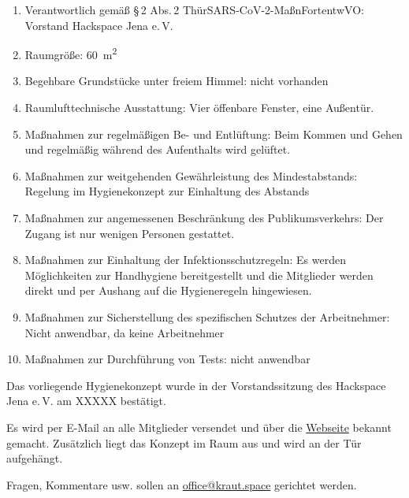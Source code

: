\documentclass[a4paper,12pt,parskip=half]{scrartcl}
\begin{document}
\begin{enumerate}
 \item Verantwortlich gemäß §\,2 Abs.\,2 ThürSARS-CoV-2-MaßnFortentwVO: Vorstand Hackspace Jena e.\,V.
 \item Raumgröße: \SI{60}{\square\metre}
 \item Begehbare Grundstücke unter freiem Himmel: nicht vorhanden
 \item Raumlufttechnische Ausstattung: Vier öffenbare Fenster, eine Außentür.
 \item Maßnahmen zur regelmäßigen Be- und Entlüftung: Beim Kommen und Gehen und regelmäßig während des Aufenthalts wird gelüftet.
 \item Maßnahmen zur weitgehenden Gewährleistung des Mindestabstands: Regelung
   im Hygienekonzept zur Einhaltung des Abstands
 \item Maßnahmen zur angemessenen Beschränkung des Publikumsverkehrs: Der Zugang
   ist nur wenigen Personen gestattet.
 \item Maßnahmen zur Einhaltung der Infektionsschutzregeln: Es werden Möglichkeiten zur Handhygiene bereitgestellt und die Mitglieder werden direkt und per Aushang auf die Hygieneregeln hingewiesen.
 \item Maßnahmen zur Sicherstellung des spezifischen Schutzes der Arbeitnehmer:
   Nicht anwendbar, da keine Arbeitnehmer
 \item Maßnahmen zur Durchführung von Tests: nicht anwendbar
\end{enumerate}

Das vorliegende Hygienekonzept wurde in der Vorstandssitzung des Hackspace Jena e.\,V. am XXXXX bestätigt.

Es wird per E-Mail an alle Mitglieder versendet und über die
\href{https://kraut.space}{Webseite} bekannt gemacht. Zusätzlich liegt das Konzept im Raum aus und wird an der Tür aufgehängt.

Fragen, Kommentare usw. sollen an
\href{mailto:office@kraut.space}{office@kraut.space} gerichtet werden.

\begin{versionhistory}
\end{versionhistory}
\end{document}
